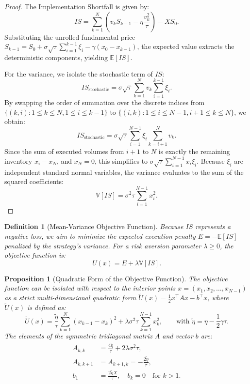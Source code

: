 \documentclass[11pt,a4paper]{article}
\newtheorem{proposition}[theorem]{Proposition}
\newtheorem{definition}[theorem]{Definition}
\begin{document}
\begin{proof}
The Implementation Shortfall is given by:
\[ IS = \sum_{k=1}^{N} \left( v_k S_{k-1} - \eta \frac{v_k^2}{\tau} \right) - X S_0. \]
Substituting the unrolled fundamental price $S_{k-1} = S_0 + \sigma \sqrt{\tau} \sum_{i=1}^{k-1} \xi_i - \gamma(x_0 - x_{k-1})$, the expected value extracts the deterministic components, yielding $\mathbb{E}[IS]$.

For the variance, we isolate the stochastic term of $IS$:
\[ IS_{\text{stochastic}} = \sigma \sqrt{\tau} \sum_{k=1}^{N} v_k \sum_{i=1}^{k-1} \xi_i. \]
By swapping the order of summation over the discrete indices from $\{(k,i) : 1 \le k \le N, 1 \le i \le k-1\}$ to $\{(i,k) : 1 \le i \le N-1, i+1 \le k \le N\}$, we obtain:
\[ IS_{\text{stochastic}} = \sigma \sqrt{\tau} \sum_{i=1}^{N-1} \xi_i \sum_{k=i+1}^{N} v_k. \]
Since the sum of executed volumes from $i+1$ to $N$ is exactly the remaining inventory $x_i - x_N$, and $x_N = 0$, this simplifies to $\sigma \sqrt{\tau} \sum_{i=1}^{N-1} x_i \xi_i$. Because $\xi_i$ are independent standard normal variables, the variance evaluates to the sum of the squared coefficients:
\[ \mathbb{V}[IS] = \sigma^2 \tau \sum_{i=1}^{N-1} x_i^2. \]
\end{proof}

\begin{definition}[Mean-Variance Objective Function]
Because $IS$ represents a negative loss, we aim to minimize the expected execution penalty $E = -\mathbb{E}[IS]$ penalized by the strategy's variance. For a risk aversion parameter $\lambda \geq 0$, the objective function is:
\begin{equation}
U(x) = E + \lambda \mathbb{V}[IS].
\end{equation}
\end{definition}

\begin{proposition}[Quadratic Form of the Objective Function]
The objective function can be isolated with respect to the interior points $x = (x_1, x_2, \dots, x_{N-1})$ as a strict multi-dimensional quadratic form $\tilde{U}(x) = \frac{1}{2} x^\top A x - b^\top x$, where $\tilde{U}(x)$ is defined as:
\begin{equation}
\tilde{U}(x) = \frac{\tilde{\eta}}{\tau} \sum_{k=1}^{N} (x_{k-1} - x_k)^2 + \lambda \sigma^2 \tau \sum_{k=1}^{N-1} x_k^2, \qquad \text{with } \tilde{\eta} = \eta - \frac{1}{2} \gamma \tau.
\end{equation}
The elements of the symmetric tridiagonal matrix $A$ and vector $b$ are:
\begin{align*}
A_{k,k} &= \frac{4\tilde{\eta}}{\tau} + 2 \lambda \sigma^2 \tau, \\
A_{k, k+1} &= A_{k+1, k} = -\frac{2\tilde{\eta}}{\tau}, \\
b_1 &= \frac{2\tilde{\eta}X}{\tau}, \quad b_k = 0 \quad \text{for } k > 1.
\end{align*}
\end{proposition}
\end{document}
